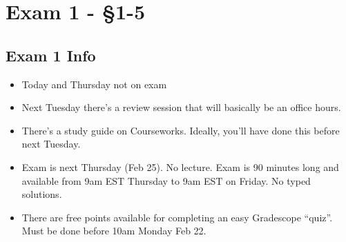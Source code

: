\section{Exam 1 - \S 1-5}

\subsection{Exam 1 Info}
\begin{itemize}
	\item Today and Thursday not on exam
	\item Next Tuesday there's a review session that will basically be an office hours.
	\item There's a study guide on Courseworks. Ideally, you'll have done this before next Tuesday.
	\item Exam is next Thursday (Feb 25). No lecture. Exam is 90 minutes long and available from 9am EST Thursday to 9am EST on Friday. No typed solutions.
	\item There are free points available for completing an easy Gradescope ``quiz''. Must be done before 10am Monday Feb 22.
\end{itemize}





